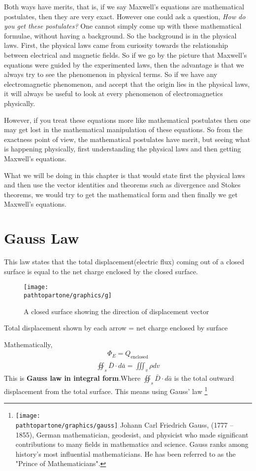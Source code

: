 Both ways have merits, that is, if we say Maxwell's equations are mathematical postulates, then they are very exact. However one could ask a question, \emph{How do you get these postulates?} One cannot simply come up with these mathematical formulae, without having a background. So the background is in the physical laws. First, the physical laws came from curiosity towards the relationship between electrical and magnetic fields. So if we go by the picture that Maxwell's equations were guided by the experimented laws, then the advantage is that we always try to see the phenomenon in physical terms. So if we have any electromagnetic phenomenon, and accept that the origin lies in the physical laws, it will always be useful to look at every phenomenon of electromagnetics physically.

However, if you treat these equations more like mathematical postulates then one may get lost in the mathematical manipulation of these equations. So from the exactness point of view, the mathematical postulates have merit, but seeing what is happening physically, first understanding the physical laws and then getting Maxwell's equations.

What we will be doing in this chapter is that would state first the physical laws and then use the vector identities and theorems such as divergence and Stokes theorems, we would try to get the mathematical form and then finally we get Maxwell's equations.

\section{Gauss Law}
This law states that the total displacement(electric flux) coming out of a closed surface is equal to the net charge enclosed by the closed surface.

\begin{figure}[h]
	\centering
	\texttt{[image: \\pathtopartone/graphics/g]}
	\caption{A closed surface showing the direction of displacement vector}
	\label{fig:g}
\end{figure}
Total displacement shown by each arrow = net charge enclosed by surface

Mathematically, 
\begin{align}
	\Phi_E = Q_{\text{enclosed}}
\end{align}
\begin{align}
	\boxed{\oiint_s\bar{D}\cdot{d\bar{a}} = \iiint_v\rho dv}
\end{align}
This is \textbf{Gauss law in integral form}.Where $\oiint_s\bar{D}\cdot d\bar{a}$ is the total outward displacement from the total surface. This means using Gauss' law
\footnote[5]{\texttt{[image: \\pathtopartone/graphics/gauss]} 
Johann Carl Friedrich Gauss, (1777 – 1855), German mathematician, geodesist, and physicist who made significant contributions to many fields in mathematics and science. Gauss ranks among history's most influential mathematicians. He has been referred to as the "Prince of Mathematicians". 
}

